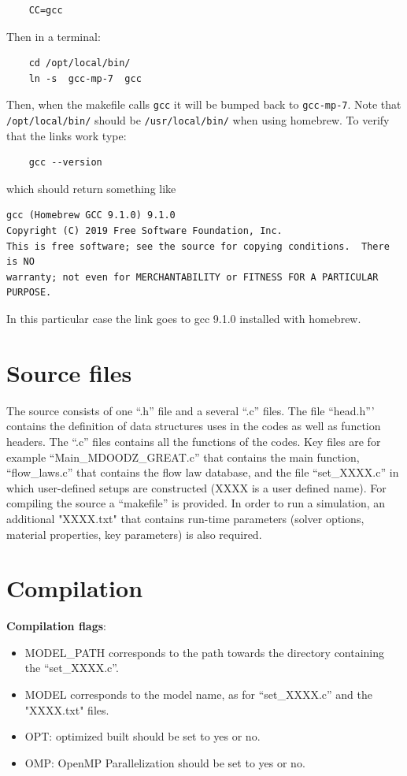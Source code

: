 \documentclass[12pt,english,openany]{scrbook}
\begin{document}
\begin{verbatim} 
	CC=gcc
\end{verbatim}

Then in a terminal:
\begin{verbatim} 
	cd /opt/local/bin/
	ln -s  gcc-mp-7  gcc
\end{verbatim}

Then, when the makefile calls \verb|gcc| it will be bumped back to \verb|gcc-mp-7|. Note that \verb|/opt/local/bin/| should be \verb|/usr/local/bin/| when using homebrew. To verify that the links work type:

\begin{verbatim} 
	gcc --version
\end{verbatim}

which should return something like
\begin{verbatim} 
gcc (Homebrew GCC 9.1.0) 9.1.0
Copyright (C) 2019 Free Software Foundation, Inc.
This is free software; see the source for copying conditions.  There is NO
warranty; not even for MERCHANTABILITY or FITNESS FOR A PARTICULAR PURPOSE.
\end{verbatim}

In this particular case the link goes to gcc 9.1.0 installed with homebrew.



\section{Source files}

The source consists of one ``.h'' file and a several ``.c'' files.
The file ``head.h''' contains the definition of data structures uses in the codes as well as function headers.
The ``.c'' files contains all the functions of the codes. Key files are for example ``Main\_MDOODZ\_GREAT.c'' that contains the main function, ``flow\_laws.c'' that contains the flow law database, and the file ``set\_XXXX.c'' in which user-defined setups are constructed (XXXX is a user defined name). 
For compiling the source a ``makefile'' is provided.
In order to run a simulation, an additional "XXXX.txt" that contains run-time parameters (solver options, material properties, key parameters) is also required. 


\section{Compilation}

\textbf{Compilation flags}: 
\begin{itemize}
\item MODEL\_PATH corresponds to the path towards the directory containing the ``set\_XXXX.c''. 
\item MODEL corresponds to the model name, as for ``set\_XXXX.c'' and the "XXXX.txt" files.
\item OPT: optimized built should be set to yes or no.
\item OMP: OpenMP Parallelization should be set to yes or no.
\end{itemize}
\end{document}
